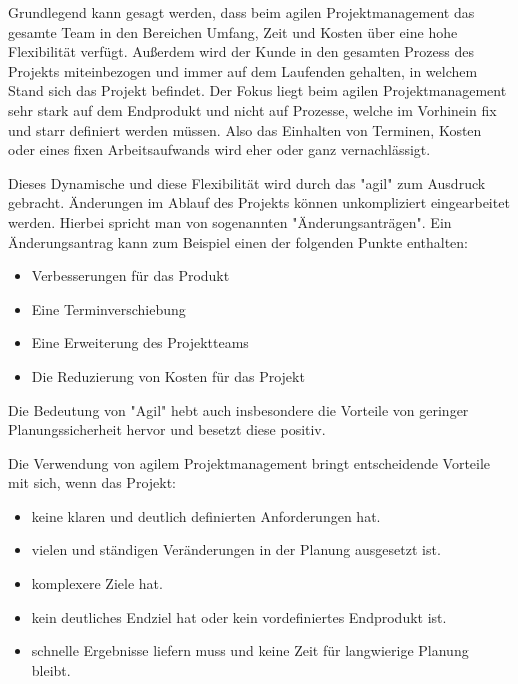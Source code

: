 

Grundlegend kann gesagt werden, dass beim agilen Projektmanagement das gesamte Team in den Bereichen Umfang, Zeit und Kosten über eine hohe Flexibilität verfügt. Außerdem wird der Kunde in den gesamten Prozess des Projekts miteinbezogen und immer auf dem Laufenden gehalten, in welchem Stand sich das Projekt befindet. Der Fokus liegt beim agilen Projektmanagement sehr stark auf dem Endprodukt und nicht auf Prozesse, welche im Vorhinein fix und starr definiert werden müssen. Also das Einhalten von Terminen, Kosten oder eines fixen Arbeitsaufwands wird eher oder ganz vernachlässigt. 

Dieses Dynamische und diese Flexibilität wird durch das "agil" zum Ausdruck gebracht. Änderungen im Ablauf des Projekts können unkompliziert eingearbeitet werden. Hierbei spricht man von sogenannten "Änderungsanträgen". Ein Änderungsantrag kann zum Beispiel einen der folgenden Punkte enthalten:

\begin{itemize}
    \item Verbesserungen für das Produkt
    \item Eine Terminverschiebung
    \item Eine Erweiterung des Projektteams
    \item Die Reduzierung von Kosten für das Projekt
\end{itemize}

Die Bedeutung von "Agil" hebt auch insbesondere die Vorteile von geringer Planungssicherheit hervor und besetzt diese positiv. \cite{agil} \cite{Aenderung}


Die Verwendung von agilem Projektmanagement bringt entscheidende Vorteile mit sich, wenn das Projekt:

\begin{itemize}
    \item keine klaren und deutlich definierten Anforderungen hat.
    \item vielen und ständigen Veränderungen in der Planung ausgesetzt ist.
    \item komplexere Ziele hat.
    \item kein deutliches Endziel hat oder kein vordefiniertes Endprodukt ist.
    \item schnelle Ergebnisse liefern muss und keine Zeit für langwierige Planung bleibt.
\end{itemize}

